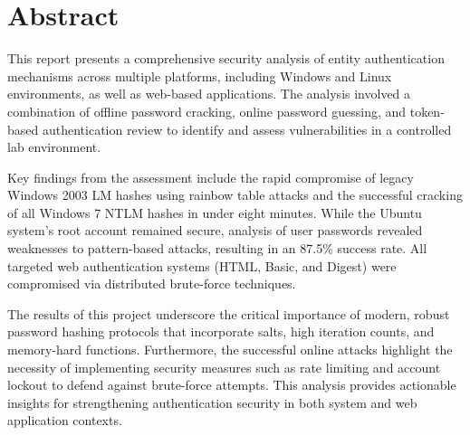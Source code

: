 \section*{Abstract}

This report presents a comprehensive security analysis of entity authentication mechanisms across multiple platforms, including Windows and Linux environments, as well as web-based applications. The analysis involved a combination of offline password cracking, online password guessing, and token-based authentication review to identify and assess vulnerabilities in a controlled lab environment.

Key findings from the assessment include the rapid compromise of legacy Windows 2003 LM hashes using rainbow table attacks and the successful cracking of all Windows 7 NTLM hashes in under eight minutes. While the Ubuntu system's root account remained secure, analysis of user passwords revealed weaknesses to pattern-based attacks, resulting in an 87.5\% success rate. All targeted web authentication systems (HTML, Basic, and Digest) were compromised via distributed brute-force techniques.

The results of this project underscore the critical importance of modern, robust password hashing protocols that incorporate salts, high iteration counts, and memory-hard functions. Furthermore, the successful online attacks highlight the necessity of implementing security measures such as rate limiting and account lockout to defend against brute-force attempts. This analysis provides actionable insights for strengthening authentication security in both system and web application contexts.